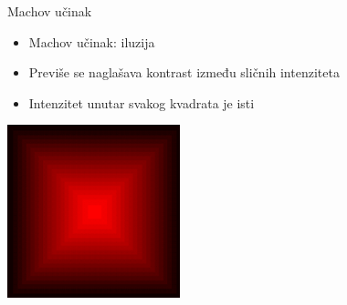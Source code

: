 \documentclass[9pt]{beamer}
\begin{document}
\begin{frame}{Machov učinak}
	\begin{itemize}
		\item Machov učinak: iluzija
		\item Previše se naglašava kontrast između sličnih intenziteta
		\item Intenzitet unutar svakog kvadrata je isti
	\end{itemize}
	
	\begin{center}
		\includegraphics[width=5cm]{slike/mach_ucinak.png}
	\end{center}
\end{frame}

\end{document}
